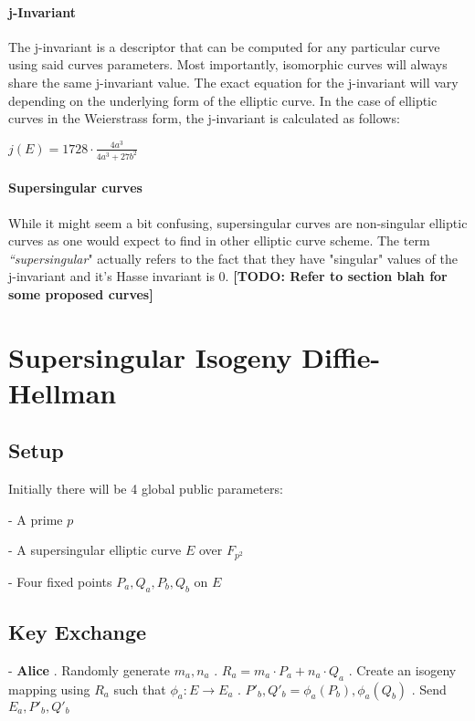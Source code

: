 \documentclass[10pt,twocolumn]{article} %
\begin{document}
\paragraph{j-Invariant}
The j-invariant is a descriptor that can be computed for any particular curve using said curves parameters. Most importantly, isomorphic curves will always share the same j-invariant value. The exact equation for the j-invariant will vary depending on the underlying form of the elliptic curve. In the case of elliptic curves in the Weierstrass form, the j-invariant is calculated as follows:

\begin{center}
	\centering
	$j(E)=1728\cdot\frac{4a^3}{4a^3+27b^2}$
\end{center}


\paragraph{Supersingular curves} While it might seem a bit confusing, supersingular curves are non-singular elliptic curves as one would expect to find in other elliptic curve scheme. The term \textit{``supersingular}" actually refers to the fact that they have "singular" values of the j-invariant and it's Hasse invariant is 0. \textbf{[TODO: Refer to section blah for some proposed curves]}

\section{Supersingular Isogeny Diffie-Hellman}

\subsection{Setup}
Initially there will be 4 global public parameters:
\par - A prime $p$ 
\par - A supersingular elliptic curve $E$ over $F_{p^2}$
\par - Four fixed points $P_a,Q_a,P_b,Q_b$ on $E$ 

\subsection{Key Exchange}
- \textbf{Alice} 
. Randomly generate $ m_{a},n_{a}$
. $R_{a} = m_{a}\cdot P_{a}+n_{a}\cdot Q_{a}$
. Create an isogeny mapping using $R_{a}$ such that $\phi_{a}: E \rightarrow E_{a}$
. $P'_{b},Q'_{b}=\phi_{a}(P_{b}),\phi_{a}(Q_{b})$
. Send $E_{a},P'_{b},Q'_{b}$
\end{document}
